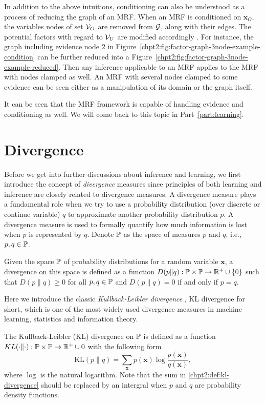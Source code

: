 In addition to the above intuitions, conditioning can also be understood as a process of reducing the graph of an MRF. When an MRF is conditioned on $\bm{x}_O$, the variables nodes of set $\mathcal{V}_O$ are removed from $\mathcal{G}$, along with their edges. The potential factors with regard to $\mathcal{V}_U$ are modified accordingly \cite[Chapter~4.2.3]{koller2009pgm}. For instance,
the graph including evidence node $2$ in Figure~\ref{chpt2:fig:factor-graph-3node-example-condition} can be further reduced into a Figure~\ref{chpt2:fig:factor-graph-3node-example-reduced}. Then any inference applicable to an MRF applies to the MRF with nodes clamped as well. An MRF with several nodes clamped to some evidence can be seen either as a manipulation of its domain or the graph itself.


It can be seen that the MRF framework is capable of handling evidence and conditioning as well. We will come back to this topic in Part~\ref{part:learning}.

\section{Divergence}\label{chpt2:sec:devergence}
Before we get into further discussions about inference and learning, we first introduce the concept of \textit{divergence} measures since principles of both learning and inference are closely related to divergence measures.
A divergence measure plays a fundamental role when we try to use a probability distribution (over discrete or continue variable)  $q$ to approximate another probability distribution $p$. A divergence measure is used to formally quantify how much information is lost when $p$ is represented by $q$. Denote $\mathbb{P}$ as the space of measures $p$ and $q$, i.e., $p, q \in \mathbb{P}$.
\begin{definition}
  Given the space $\mathbb{P}$ of probability distributions for a random variable $\bm{x}$, a divergence on this space is defined as a function $D(p\|q): \mathbb{P} \times \mathbb{P} \rightarrow \mathbb{R}^{+}\cup \{0\}$ such that $D(p\|q) \geq 0$ for all $p, q \in \mathbb{P}$ and $D(p\|q)=0$ if and only if $p=q$.
\end{definition}

Here we introduce the classic \textit{Kullback-Leibler divergence} \cite{kullback1959, kullback1951}, KL divergence for short, which is one of the most widely used divergence measures in machine learning, statistics and information theory.
\begin{definition}
  The Kullback-Leibler (KL) divergence on $\mathbb{P}$ is defined as a function $KL(\cdot \| \cdot): \mathbb{P} \times \mathbb{P} \rightarrow \mathbb{R}^{+} \cup {0}$ with the following form
  \begin{equation}\label{chpt2:def:kl-divergence}
    \mathrm{KL}(p\|q) = \sum_{\bm{x}}p(\bm{x}) \log{\frac{p(\bm{x})}{q(\bm{x})}},
  \end{equation}
  where $\log$ is the natural logarithm. Note that the sum in \eqref{chpt2:def:kl-divergence} should be replaced by an intergral when $p$ and $q$ are probability density functions.
\end{definition}


